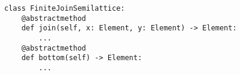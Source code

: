 \par\begin{minipage}{60ex}
\begin{verbatim}
class FiniteJoinSemilattice:
    @abstractmethod
    def join(self, x: Element, y: Element) -> Element:
        ...
    @abstractmethod
    def bottom(self) -> Element:
        ...
\end{verbatim}
\end{minipage}\par